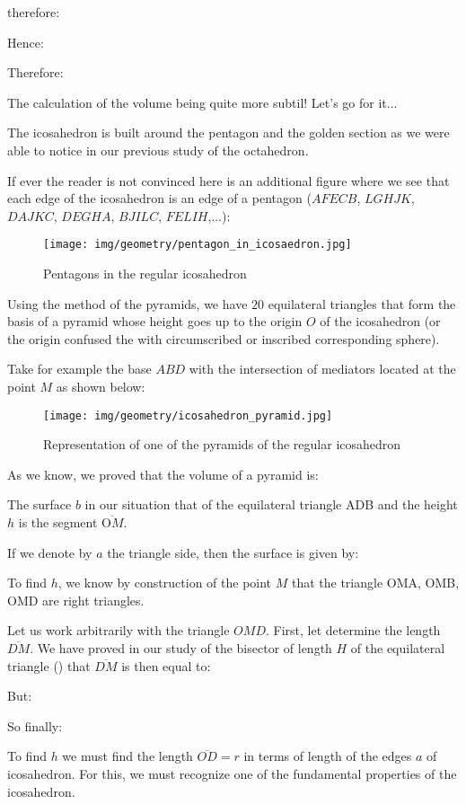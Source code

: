 {	therefore:
	
	Hence:
	
	Therefore:
	
	The calculation of the volume being quite more subtil! Let's go for it...
	
	The icosahedron is built around the pentagon and the golden section as we were able to notice in our previous study of the octahedron.
	
	If ever the reader is not convinced here is an additional figure where we see that each edge of the icosahedron is an edge of a pentagon ($AFECB$, $LGHJK$, $DAJKC$, $DEGHA$, $BJILC$, $FELIH$,...):
	\begin{figure}[H]
		\centering
		\texttt{[image: img/geometry/pentagon\_in\_icosaedron.jpg]}
		\caption{Pentagons in the regular icosahedron}
	\end{figure}
	Using the method of the pyramids, we have $20$ equilateral triangles that form the basis of a pyramid whose height goes up to the origin $O$ of the icosahedron (or the origin confused the with circumscribed or inscribed corresponding sphere).
	
	Take for example the base $ABD$ with the intersection of mediators located at the point $M$ as shown below:
	\begin{figure}[H]
		\centering
		\texttt{[image: img/geometry/icosahedron\_pyramid.jpg]}
		\caption{Representation of one of the pyramids of the regular icosahedron}
	\end{figure}
	As we know, we proved that the volume of a pyramid is:
	
	The surface $b$ in our situation that of the equilateral triangle ADB and the height $h$ is the segment $\overline{\text{O}M}$.

	If we denote by $a$ the triangle side, then the surface is given by:
	
	To find $h$, we know by construction of the point $M$ that the triangle OMA, OMB, OMD are right triangles.

	Let us work arbitrarily with the triangle $OMD$. First, let determine the length $\overline{DM}$. We have proved in our study of the bisector of length $H$ of the equilateral triangle () that $\overline{DM}$ is then equal to:
	
	But:
	
	So finally:
	
	To find $h$ we must find the length $\overline{OD}=r$ in terms of length of the edges $a$ of icosahedron. For this, we must recognize one of the fundamental properties of the icosahedron.

}
